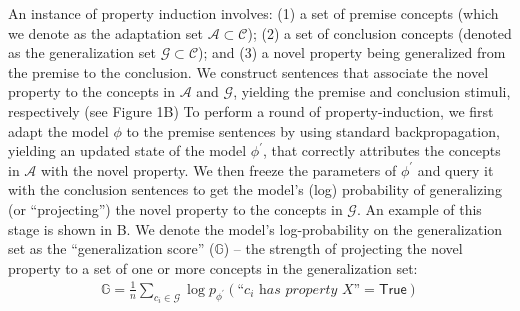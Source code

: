 \documentclass[10pt,letterpaper]{article}
\newcommand{\km}[1]{\textcolor{purple}{$_{KM}$[#1]}}
\newcommand{\adaptation}{\mathcal{A}}
\newcommand{\generalization}{\mathcal{G}}
\newcommand{\concepts}{\mathcal{C}}
\newcommand{\true}{\mathsf{True}}
\newcounter{argument}
\begin{document}
An instance of property induction involves: (1) a set of premise concepts (which we denote as the adaptation set $\adaptation \subset \concepts$); (2) a set of conclusion concepts (denoted as the generalization set $\generalization \subset \concepts$); and (3) a novel property being generalized from the premise to the conclusion.
We construct sentences that associate the novel property to the concepts in $\adaptation$ and $\generalization$, yielding the premise and conclusion stimuli, respectively (see Figure 1B)
To perform a round of property-induction, we first adapt the model $\phi$ to the premise sentences by using standard backpropagation, yielding an updated state of the model $\phi^{\prime}$, that correctly attributes the concepts in $\adaptation$ with the novel property.
We then freeze the parameters of $\phi^{\prime}$ and query it with the conclusion sentences to get the model's (log) probability of generalizing (or ``projecting'') the novel property to the concepts in $\generalization$.
An example of this stage is shown in B.
We denote the model's log-probability on the generalization set as the ``generalization score'' ($\mathbb{G}$) -- the strength of projecting the novel property to a set of one or more concepts in the generalization set:
\begin{align}
    \mathbb{G} = \frac{1}{n}\sum_{\textit{c}_i \in \mathcal{G}} \log p_{\phi^{\prime}}(\textit{``c}_i\textit{ has property X''} = \true)\label{eq:genscore}
\end{align}
\end{document}
